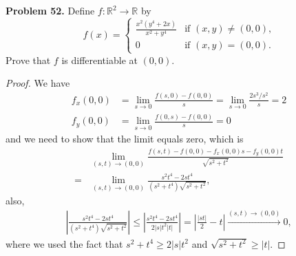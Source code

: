 \documentclass[12pt,leqno]{amsart}
\theoremstyle{definition}
\begin{document}
\noindent
{\bf Problem 52.}
Define $f:\mathbb{R}^2\to\mathbb{R}$ by
$$
f(x)=
\begin{cases}
\frac{x^2(y^4+2x)}{x^2+y^4} & \text{if $(x,y)\neq (0,0)$,}\\
0                           & \text{if $(x,y)=(0,0)$.}
\end{cases}
$$
Prove that $f$ is differentiable at $(0,0)$.
\begin{proof}
We have 
\begin{align*}
    f_x(0,0) & = \lim_{s\to 0} \frac{f(s,0) - f(0,0)}{s} = \lim_{s\to 0} \frac{2s^3/s^2}{s} = 2 \\
    f_y(0,0) & = \lim_{s\to 0} \frac{f(0,s) - f(0,0)}{s} = 0
\end{align*}
and we need to show that the limit equals zero, which is 
\begin{align*}
    & \lim_{(s,t)\to (0,0)} \frac{f(s,t) - f(0,0) - f_x(0,0)s - f_y(0,0)t}{\sqrt{s^2 + t^2}} \\
    = & \lim_{(s,t)\to (0,0)} \frac{s^2 t^4 - 2s t^4}{(s^2+t^4)\sqrt{s^2 + t^2}},
\end{align*}
also,
\begin{align*}
    \left|\frac{s^2 t^4 - 2s t^4}{(s^2+t^4)\sqrt{s^2 + t^2}}\right| \leq \left|\frac{s^2 t^4 - 2s t^4}{2 |s| t^2 |t|}\right| = \left| \frac{|st|}{2} - t \right| \xrightarrow{(s,t)\to (0,0)} 0,
\end{align*}
where we used the fact that $s^2 + t^4 \geq 2|s|t^2$ and $\sqrt{s^2 + t^2} \geq |t|$.
\end{proof}

\medskip
\end{document}
